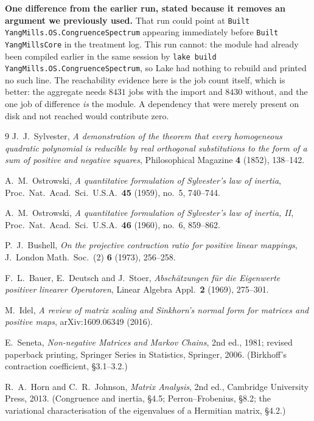 \documentclass[11pt,a4paper]{article}
\theoremstyle{plain}
\theoremstyle{definition}
\begin{document}
\textbf{One difference from the earlier run, stated because it removes an
argument we previously used.} That run could point at
\texttt{Built YangMills.OS.CongruenceSpectrum} appearing immediately before
\texttt{Built YangMillsCore} in the treatment log. This run cannot: the module
had already been compiled earlier in the same session by
\texttt{lake build YangMills.OS.CongruenceSpectrum}, so Lake had nothing to
rebuild and printed no such line. The reachability evidence here is the job count
itself, which is better: the aggregate needs $8431$ jobs with the import and
$8430$ without, and the one job of difference \emph{is} the module. A dependency
that were merely present on disk and not reached would contribute zero.

\begin{thebibliography}{9}
 J.~J.~Sylvester,
  \emph{A demonstration of the theorem that every homogeneous quadratic
  polynomial is reducible by real orthogonal substitutions to the form of a sum
  of positive and negative squares}, Philosophical Magazine \textbf{4} (1852),
  138--142.

 A.~M.~Ostrowski,
  \emph{A quantitative formulation of Sylvester's law of inertia},
  Proc.\ Nat.\ Acad.\ Sci.\ U.S.A.\ \textbf{45} (1959), no.~5, 740--744.

 A.~M.~Ostrowski,
  \emph{A quantitative formulation of Sylvester's law of inertia, II},
  Proc.\ Nat.\ Acad.\ Sci.\ U.S.A.\ \textbf{46} (1960), no.~6, 859--862.

 P.~J.~Bushell,
  \emph{On the projective contraction ratio for positive linear mappings},
  J.\ London Math.\ Soc.\ (2) \textbf{6} (1973), 256--258.

 F.~L.~Bauer, E.~Deutsch and J.~Stoer,
  \emph{Absch\"atzungen f\"ur die Eigenwerte positiver linearer Operatoren},
  Linear Algebra Appl.\ \textbf{2} (1969), 275--301.

 M.~Idel,
  \emph{A review of matrix scaling and Sinkhorn's normal form for matrices and
  positive maps}, arXiv:1609.06349 (2016).

 E.~Seneta,
  \emph{Non-negative Matrices and Markov Chains}, 2nd ed., 1981;
  revised paperback printing, Springer Series in Statistics, Springer, 2006.
  (Birkhoff's contraction coefficient, \S3.1--3.2.)

 R.~A.~Horn and C.~R.~Johnson,
  \emph{Matrix Analysis}, 2nd ed., Cambridge University Press, 2013.
  (Congruence and inertia, \S4.5; Perron--Frobenius, \S8.2; the variational
  characterisation of the eigenvalues of a Hermitian matrix, \S4.2.)


\end{thebibliography}
\end{document}
